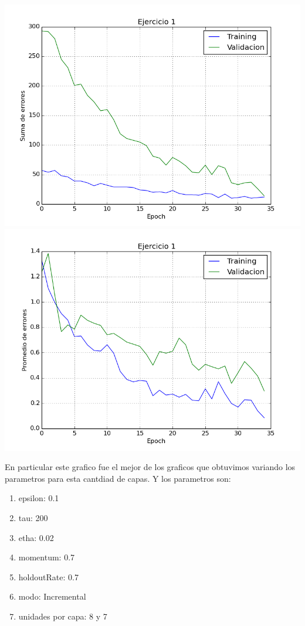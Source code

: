 \includegraphics[scale=0.4]{img/ej100207187sum}
\includegraphics[scale=0.4]{img/ej100207187mean}

En particular este grafico fue el mejor de los graficos que obtuvimos variando los parametros para esta cantdiad de capas. Y los parametros son:
\begin{enumerate}
\item epsilon: 0.1
\item tau: 200
\item etha: 0.02
\item momentum: 0.7
\item holdoutRate: 0.7
\item modo: Incremental
\item unidades por capa: 8 y 7
\end{enumerate}

